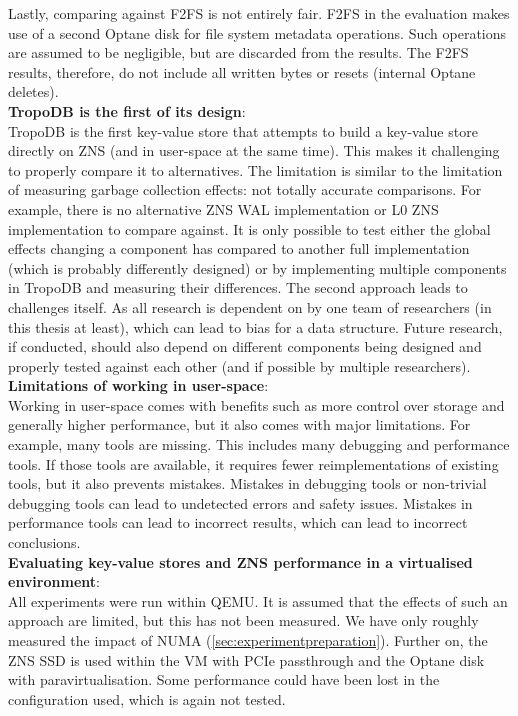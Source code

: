 Lastly, comparing against F2FS is not entirely fair. F2FS in the evaluation makes use of a second Optane disk for file system metadata operations. Such operations are assumed to be negligible, but are discarded from the results. The F2FS results, therefore, do not include all written bytes or resets (internal Optane deletes). \\
\textbf{TropoDB is the first of its design}:\\
TropoDB is the first key-value store that attempts to build a key-value store directly on ZNS (and in user-space at the same time). This makes it challenging to properly compare it to alternatives. The limitation is similar to the limitation of measuring garbage collection effects: not totally accurate comparisons. For example, there is no alternative ZNS WAL implementation or L0 ZNS implementation to compare against. It is only possible to test either the global effects changing a component has compared to another full implementation (which is probably differently designed) or by implementing multiple components in TropoDB and measuring their differences. The second approach leads to challenges itself. As all research is dependent on by one team of researchers (in this thesis at least), which can lead to bias for a data structure. Future research, if conducted, should also depend on different components being designed and properly tested against each other (and if possible by multiple researchers).\\
\textbf{Limitations of working in user-space}:\\
Working in user-space comes with benefits such as more control over storage and generally higher performance, but it also comes with major limitations. For example, many tools are missing. This includes many debugging and performance tools. If those tools are available, it requires fewer reimplementations of existing tools, but it also prevents mistakes. Mistakes in debugging tools or non-trivial debugging tools can lead to undetected errors and safety issues. Mistakes in performance tools can lead to incorrect results, which can lead to incorrect conclusions.\\
\textbf{Evaluating key-value stores and ZNS performance in a virtualised environment}:\\
All experiments were run within QEMU. It is assumed that the effects of such an approach are limited, but this has not been measured. We have only roughly measured the impact of NUMA (\autoref{sec:experimentpreparation}). Further on, the ZNS SSD is used within the VM with PCIe passthrough and the Optane disk with paravirtualisation. Some performance could have been lost in the configuration used, which is again not tested.\\
